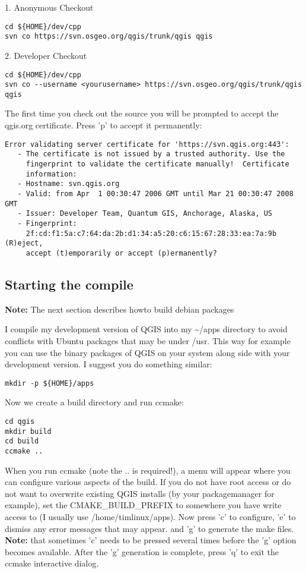 1. Anonymous Checkout

\begin{verbatim}
cd ${HOME}/dev/cpp 
svn co https://svn.osgeo.org/qgis/trunk/qgis qgis
\end{verbatim}

2. Developer Checkout

\begin{verbatim}
cd ${HOME}/dev/cpp 
svn co --username <yourusername> https://svn.osgeo.org/qgis/trunk/qgis qgis 
\end{verbatim}

The first time you check out the source you will be prompted to accept the
qgis.org certificate. Press 'p' to accept it permanently:

\begin{verbatim}
Error validating server certificate for 'https://svn.qgis.org:443':
   - The certificate is not issued by a trusted authority. Use the
     fingerprint to validate the certificate manually!  Certificate
     information:
   - Hostname: svn.qgis.org
   - Valid: from Apr  1 00:30:47 2006 GMT until Mar 21 00:30:47 2008 GMT
   - Issuer: Developer Team, Quantum GIS, Anchorage, Alaska, US
   - Fingerprint:
     2f:cd:f1:5a:c7:64:da:2b:d1:34:a5:20:c6:15:67:28:33:ea:7a:9b (R)eject,
     accept (t)emporarily or accept (p)ermanently?  
\end{verbatim}

\subsection{Starting the compile}
\textbf{Note:} The next section describes howto build debian packages

I compile my development version of QGIS into my \~{}/apps directory to avoid
conflicts with Ubuntu packages that may be under /usr. This way for example
you can use the binary packages of QGIS on your system along side with your
development version. I suggest you do something similar:

\begin{verbatim}
mkdir -p ${HOME}/apps 
\end{verbatim}

Now we create a build directory and run ccmake:

\begin{verbatim}
cd qgis
mkdir build
cd build
ccmake ..
\end{verbatim}

When you run ccmake (note the .. is required!), a menu will appear where 
you can configure various aspects of the build. If you do not have root
access or do not want to overwrite existing QGIS installs (by your
packagemanager for example), set the CMAKE\_BUILD\_PREFIX to somewhere you
have write access to (I usually use /home/timlinux/apps). Now press
'c' to configure, 'e' to dismiss any error messages that may appear.
and 'g' to generate the make files. \textbf{Note:} that sometimes 'c' needs to 
be pressed several times before the 'g' option becomes available.
After the 'g' generation is complete, press 'q' to exit the ccmake 
interactive dialog.

